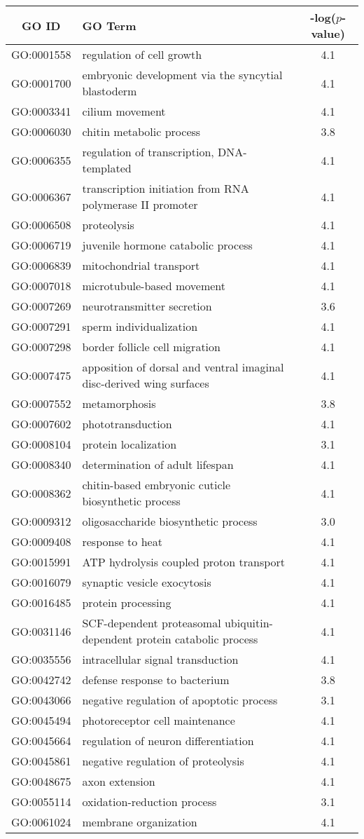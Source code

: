 \centering \begin{tabular}{c|p{3in}|c}
GO ID	&GO Term	&-log($p$-value)\\\hline
GO:0001558	&regulation of cell growth	&4.1\\
GO:0001700	&embryonic development via the syncytial blastoderm	&4.1\\
GO:0003341	&cilium movement	&4.1\\
GO:0006030	&chitin metabolic process	&3.8\\
GO:0006355	&regulation of transcription, DNA-templated	&4.1\\
GO:0006367	&transcription initiation from RNA polymerase II promoter	&4.1\\
GO:0006508	&proteolysis	&4.1\\
GO:0006719	&juvenile hormone catabolic process	&4.1\\
GO:0006839	&mitochondrial transport	&4.1\\
GO:0007018	&microtubule-based movement	&4.1\\
GO:0007269	&neurotransmitter secretion	&3.6\\
GO:0007291	&sperm individualization	&4.1\\
GO:0007298	&border follicle cell migration	&4.1\\
GO:0007475	&apposition of dorsal and ventral imaginal disc-derived wing surfaces	&4.1\\
GO:0007552	&metamorphosis	&3.8\\
GO:0007602	&phototransduction	&4.1\\
GO:0008104	&protein localization	&3.1\\
GO:0008340	&determination of adult lifespan	&4.1\\
GO:0008362	&chitin-based embryonic cuticle biosynthetic process	&4.1\\
GO:0009312	&oligosaccharide biosynthetic process	&3.0\\
GO:0009408	&response to heat	&4.1\\
GO:0015991	&ATP hydrolysis coupled proton transport	&4.1\\
GO:0016079	&synaptic vesicle exocytosis	&4.1\\
GO:0016485	&protein processing	&4.1\\
GO:0031146	&SCF-dependent proteasomal ubiquitin-dependent protein catabolic process	&4.1\\
GO:0035556	&intracellular signal transduction	&4.1\\
GO:0042742	&defense response to bacterium	&3.8\\
GO:0043066	&negative regulation of apoptotic process	&3.1\\
GO:0045494	&photoreceptor cell maintenance	&4.1\\
GO:0045664	&regulation of neuron differentiation	&4.1\\
GO:0045861	&negative regulation of proteolysis	&4.1\\
GO:0048675	&axon extension	&4.1\\
GO:0055114	&oxidation-reduction process	&3.1\\
GO:0061024	&membrane organization	&4.1\\
\end{tabular}

